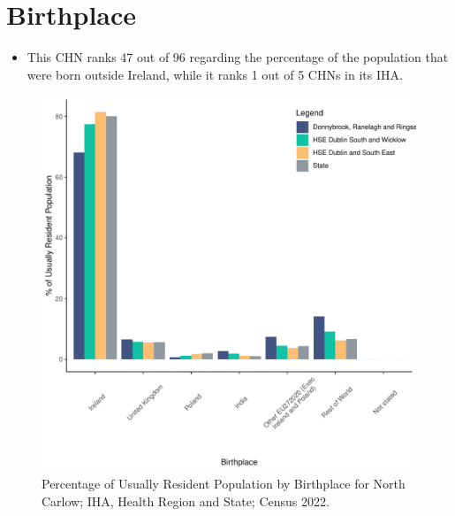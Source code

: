 \documentclass{article}
\begin{document}
\section{Birthplace}\label{sect:Birth}
\begin{itemize}
\item This CHN ranks  47 out of 96 regarding the percentage of the population that were born outside Ireland, while it ranks  1 out of 5 CHNs in its IHA.
\end{itemize}
\begin{figure}[H]
	\centering
	\includegraphics[width = 130mm]{../figures/BirthED.pdf}
	\caption{Percentage of Usually Resident Population by Birthplace for North Carlow; IHA, Health Region and State; Census 2022.}
	\label{fig:vbnv}
	\end{figure}
	
\end{document}
